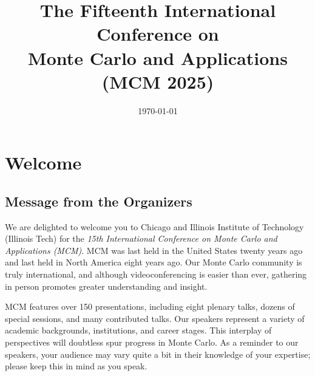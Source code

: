 \title{The Fifteenth International Conference on \\
	Monte Carlo and Applications \\
	(MCM 2025) }
\date{\today}
\maketitle

\thispagestyle{empty} \tableofcontents


\chapter{Welcome}

\section{Message from the Organizers}


We are delighted to welcome you to Chicago and Illinois Institute of Technology (Illinois Tech) for the \emph{15th International Conference on Monte Carlo and Applications (MCM)}. MCM was last held in the United States twenty years ago and last held in North America eight years ago.  Our Monte Carlo community is truly international, and although videoconferencing is easier than ever, gathering in person promotes greater understanding and insight.

MCM features over 150 presentations, including eight plenary talks,  dozens of special sessions, and many contributed talks.  Our speakers represent a variety of academic backgrounds, institutions, and career stages.  This interplay of perspectives will doubtless spur progress in Monte Carlo.  As a reminder to our speakers, your audience may vary quite a bit in their knowledge of your expertise; please keep this in mind as you speak.

